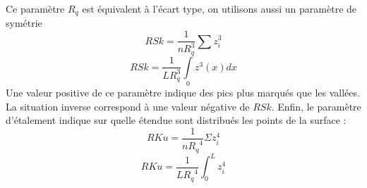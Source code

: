 Ce paramètre $R_q$ est équivalent à l’écart type, on utilisons aussi un paramètre de symétrie
\begin{equation}
	RSk=\frac{1}{n{R}_{q}^{3}}\sum {z}_{i}^{3}
\end{equation}
\begin{equation}
	RSk=\frac{1}{L{R}_{q}^{3}}\underset{0}{\int }{z}^{3}\left(x\right)dx
\end{equation}
Une valeur positive de ce paramètre indique des pics plus marqués que les vallées. La
situation inverse correspond à une valeur négative de $RSk$. Enfin, le paramètre d’étalement
indique sur quelle étendue sont distribués les points de la surface :
\begin{equation}
	RKu=\frac{1}{n{R_q}^{4}}\Sigma {z}_{i}^{4}
\end{equation}
\begin{equation}
	RKu=\frac{1}{L{R_q}^{4}}\int_{0}^{L}{z}_{i}^{4}
\end{equation}
